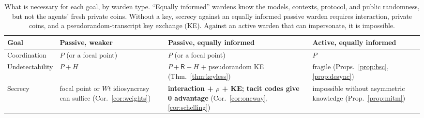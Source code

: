 \begin{table}[t]
\centering
\caption{What is necessary for each goal, by warden type. ``Equally informed'' wardens know the models, contexts, protocol, and public randomness, but not the agents' fresh private coins. Without a key, secrecy against an equally informed passive warden requires interaction, private coins, and a pseudorandom-transcript key exchange (KE). Against an active warden that can impersonate, it is impossible.}
\label{tab:necessity}
\small
\begin{tabular}{@{}>{\raggedright}p{}>{\raggedright}p{}>{\raggedright}p{}>{\raggedright\arraybackslash}p{}@{}}
\toprule
{\bf Goal} & {\bf Passive, weaker} & {\bf Passive, equally informed} & {\bf Active, equally informed} \\
\midrule
Coordination & $P$ (or a focal point) & $P$ (or a focal point) & $P$ \\
Undetectability & $P + H$ & $P + \mathsf{R} + H$ + pseudorandom KE (Thm.~\ref{thm:keyless}) & fragile (Props.~\ref{prop:bsc}, \ref{prop:desync}) \\
Secrecy & focal point or $W\!t$ idiosyncrasy can suffice (Cor.~\ref{cor:weights}) & {\bf interaction + $\rho$ + KE; tacit codes give 0 advantage} (Cor.~\ref{cor:oneway}, \ref{cor:schelling}) & impossible without asymmetric knowledge (Prop.~\ref{prop:mitm}) \\
\bottomrule
\end{tabular}
\end{table}
